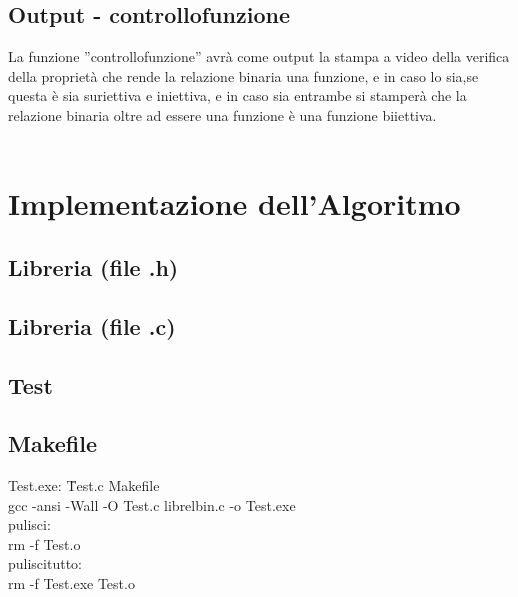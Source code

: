 \documentclass[11pt, a4paper, titlepage, block]{article}
\begin{document}
	\subsection{Output - controllo\textunderscore funzione}
	La funzione ”controllo\textunderscore funzione” avr\`a come output la stampa a video della verifica della propriet\`a che rende la relazione binaria una funzione, e in caso lo sia,se questa \`e sia suriettiva e iniettiva, e in caso sia entrambe si stamper\`a che la relazione binaria oltre ad essere una funzione \`e una funzione biiettiva.\\
	\\
	\newpage
	\section{Implementazione dell'Algoritmo}
	\subsection{Libreria (file .h) }
	\lstset{numbers=left, tabsize=2,breaklines=true, language=C}
	 
	\newpage
	\subsection{Libreria (file .c) }
	\lstset{numbers=left, tabsize=2,breaklines=true, language=C}
	 
	\newpage	
	\subsection{Test}
	\lstset{numbers=left, tabsize=2,breaklines=true, language=C}
	
	\newpage
\subsection{Makefile}
\begin{tabbing}
	Test.exe: \=Test.c Makefile\\
	\>gcc -ansi -Wall -O Test.c lib\textunderscore rel\textunderscore bin.c -o Test.exe\\
	pulisci:\\
	\>rm -f Test.o\\
	pulisci\textunderscore tutto:\\
	\>rm -f Test.exe Test.o\\
\end{tabbing}
	
	
	
	
	
\end{document}

